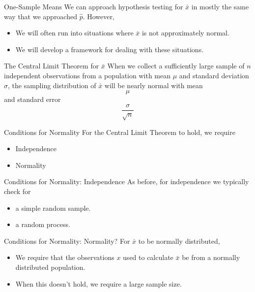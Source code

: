 \begin{frame}{One-Sample Means}
    We can approach hypothesis testing for $\bar{x}$ in mostly the same way that we approached $\hat{p}$. However,
    \begin{itemize}
        \item We will often run into situations where $\bar{x}$ is not approximately normal.
        \item We will develop a framework for dealing with these situations.
    \end{itemize}
\end{frame}

\begin{frame}{The Central Limit Theorem for $\bar{x}$}
    When we collect a sufficiently large sample of $n$ independent observations from a population with mean $\mu$ and standard deviation $\sigma$, the sampling distribution of $\bar{x}$ will be nearly normal with mean
    \[
        \mu 
    \]
    and standard error
    \[
        \frac{\sigma}{\sqrt{n}}
    \]
\end{frame}

\begin{frame}{Conditions for Normality}
    For the Central Limit Theorem to hold, we require
    \begin{itemize}
        \item Independence
        \item Normality
    \end{itemize}
\end{frame}

\begin{frame}{Conditions for Normality: Independence}
    As before, for independence we typically check for 
    \begin{itemize}
        \item a simple random sample.
        \item a random process.
    \end{itemize}
\end{frame}

\begin{frame}{Conditions for Normality: Normality?}
    For $\bar{x}$ to be normally distributed,
    \begin{itemize}
        \item We require that the observations $x$ used to calculate $\bar{x}$ be from a normally distributed population.
        \item When this doesn't hold, we require a large sample size.
    \end{itemize}
\end{frame}

